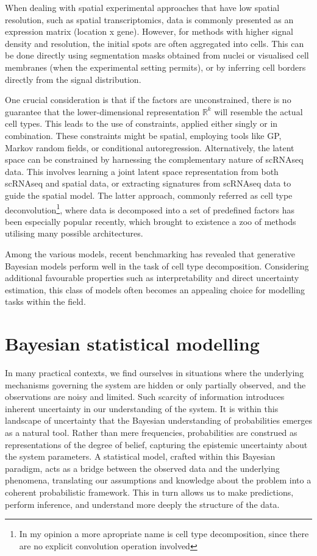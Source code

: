 When dealing with spatial experimental approaches that have low spatial resolution, such as spatial transcriptomics, data is commonly presented as an expression matrix (location x gene). However, for methods with higher signal density and resolution, the initial spots are often aggregated into cells. This can be done directly using segmentation masks obtained from nuclei or visualised cell membranes (when the experimental setting permits), or by inferring cell borders directly from the signal distribution.

One crucial consideration is that if the factors are unconstrained, there is no guarantee that the lower-dimensional representation  $\mathbb{R}^k$ will resemble the actual cell types. This leads to the use of constraints, applied either singly or in combination. These constraints might be spatial, employing tools like \ac{GP}, Markov random fields, or conditional autoregression. Alternatively, the latent space can be constrained by harnessing the complementary nature of \ac{scRNAseq} data. This involves learning a joint latent space representation from both scRNAseq and spatial data, or extracting signatures from \ac{scRNAseq} data to guide the spatial model. The latter approach, commonly referred as cell type deconvolution\footnote{In my opinion a more apropriate name is cell type decomposition, since there are no explicit convolution operation involved}, where data is decomposed into a set of predefined factors has been especially popular recently, which brought to existence a zoo of methods utilising many possible architectures.

Among the various models, recent benchmarking has revealed that generative Bayesian models perform well in the task of cell type decomposition. Considering additional favourable properties such as interpretability and direct uncertainty estimation, this class of models often becomes an appealing choice for modelling tasks within the field.

\section{Bayesian statistical modelling}

In many practical contexts, we find ourselves in situations where the underlying mechanisms governing the system are hidden or only partially observed, and the observations are noisy and limited. Such scarcity of information introduces inherent uncertainty in our understanding of the system. It is within this landscape of uncertainty that the Bayesian understanding of probabilities emerges as a natural tool. Rather than mere frequencies, probabilities are construed as representations of the degree of belief, capturing the epistemic uncertainty about the system parameters. A statistical model, crafted within this Bayesian paradigm, acts as a bridge between the observed data and the underlying phenomena, translating our assumptions and knowledge about the problem into a coherent probabilistic framework. This in turn allows us to make predictions, perform inference, and understand more deeply the structure of the data.

